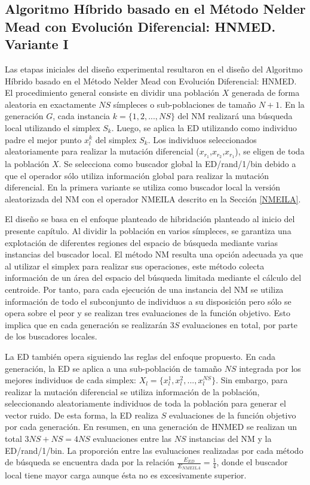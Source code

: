 
\subsection{Algoritmo Híbrido basado en el Método Nelder Mead con Evolución Diferencial: HNMED. Variante I}\label{sec:HNMEDV1}
Las etapas iniciales del diseño experimental resultaron en el diseño del Algoritmo Híbrido basado en el Método Nelder  Mead con Evolución Diferencial: HNMED. El procedimiento general  consiste en dividir una población $X$ generada de forma aleatoria en exactamente $NS$ símpleces o sub-poblaciones de tamaño $N+1$. En la generación $G$, cada instancia $k=\{1,2,...,NS\}$ del NM realizará una búsqueda local utilizando el simplex $S_k$. Luego, se aplica la ED utilizando como individuo padre el mejor punto $x^k_l$ del simplex $S_k$. Los individuos seleccionados aleatoriamente para realizar la mutación diferencial ($x_{r_1}$,$x_{r_2}$,$x_{r_1}$), se eligen de toda la población $X$. Se selecciona como buscador global la ED/rand/1/bin debido a que el operador sólo utiliza información global para realizar la mutación diferencial. En la primera variante se utiliza como buscador local la versión aleatorizada del NM con el operador NMEILA descrito en la Sección \ref{NMEILA}.

El diseño se basa en el enfoque planteado de hibridación planteado al inicio del presente capítulo. Al dividir la población en varios símpleces, se garantiza una explotación de diferentes regiones del espacio de búsqueda mediante varias instancias del buscador local. El método NM resulta una opción adecuada ya que al utilizar el simplex para realizar sus operaciones, este método colecta información de un área del espacio del búsqueda limitada mediante el cálculo del centroide. Por tanto, para cada ejecución de una instancia del NM se utiliza información de todo el subconjunto de individuos a su disposición pero sólo se opera sobre el peor y se realizan tres evaluaciones de la función objetivo. Esto implica que en cada generación se realizarán $3S$ evaluaciones en total, por parte de los buscadores locales.

La ED también opera siguiendo las reglas del enfoque propuesto. En cada generación, la ED se aplica a una sub-población de tamaño $NS$ integrada por los mejores individuos de cada simplex: $X_l=\{x^1_l,x^2_l,...,x^{NS}_l \}$. Sin embargo, para realizar la mutación diferencial se utiliza información de la población, seleccionando aleatoriamente individuos de toda la población para generar el vector ruido. De esta forma, la ED realiza $S$ evaluaciones de la función objetivo por cada generación. En resumen, en una generación de HNMED se realizan un total $3NS+NS=4NS$ evaluaciones entre las $NS$ instancias del NM y la ED/rand/1/bin. La proporción entre las evaluaciones realizadas por cada método de búsqueda se encuentra dada por la relación $\frac{E_{ED}}{E_{NMEILA}}=\frac{1}{4}$, donde el buscador local tiene mayor carga aunque ésta no es excesivamente superior. 

